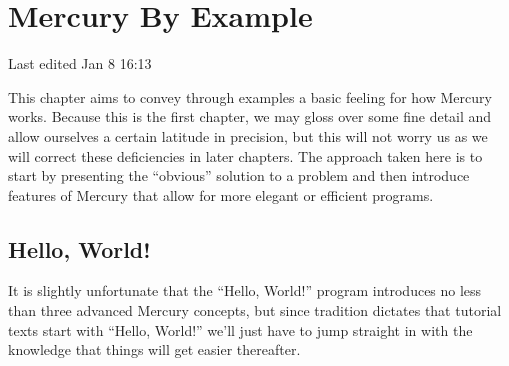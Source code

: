 \documentclass[a4paper,11pt,notitlepage,onecolumn]{book}
\begin{document}
% 

\newcommand{\polytexopenbrace}%
{\{}
\newcommand{\polytexclosebrace}%
{\}}
\newcommand{\polytexampersand}%
{\&}

\setcounter{chapter}{0}

\chapter{Mercury By Example}

Last edited Jan 8 16:13

This chapter aims to convey through examples a basic feeling for how
Mercury works.  Because this is the first chapter, we may gloss over some
fine detail and allow ourselves a certain latitude in precision, but this
will not worry us as we will correct these deficiencies in later chapters.
The approach taken here is to start by presenting the ``obvious'' solution
to a problem and then introduce features of Mercury that allow for more
elegant or efficient programs.



\section{Hello, World!}

It is slightly unfortunate that the ``Hello, World!'' program introduces
no less than three advanced Mercury concepts, but since tradition
dictates that tutorial texts start with ``Hello, World!'' we'll just
have to jump straight in with the knowledge that things will get easier
thereafter.
\end{document}
